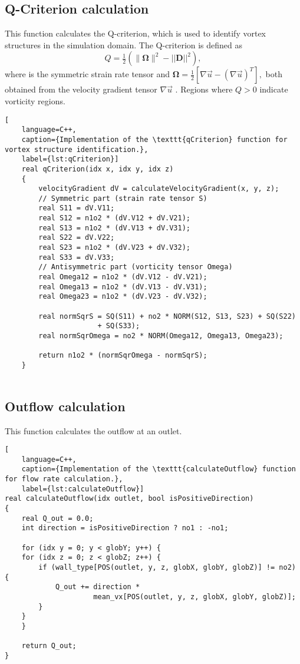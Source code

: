 \subsection*{Q-Criterion calculation}
This function calculates the Q-criterion, which is used to identify vortex structures in the simulation domain. The Q-criterion is defined as
\[
Q = \tfrac{1}{2} \left( \|\boldsymbol{\Omega}\|^{2} - ||\mathbf{D}||^{2} \right),
\]
where is the symmetric strain rate tensor and \(\boldsymbol{\Omega} = \frac{1}{2} \left[ \nabla \vec{u} - (\nabla \vec{u})^T \right],\) both obtained from the velocity gradient tensor \(\nabla \vec{u}\) \cite{Chong1990}. Regions where \(Q > 0\) indicate vorticity regions.
\begin{lstlisting}[
	language=C++,
	caption={Implementation of the \texttt{qCriterion} function for vortex structure identification.},
	label={lst:qCriterion}]
	real qCriterion(idx x, idx y, idx z)
	{
		velocityGradient dV = calculateVelocityGradient(x, y, z);
		// Symmetric part (strain rate tensor S)
		real S11 = dV.V11;
		real S12 = n1o2 * (dV.V12 + dV.V21);
		real S13 = n1o2 * (dV.V13 + dV.V31);
		real S22 = dV.V22;
		real S23 = n1o2 * (dV.V23 + dV.V32);
		real S33 = dV.V33;
		// Antisymmetric part (vorticity tensor Omega)
		real Omega12 = n1o2 * (dV.V12 - dV.V21);
		real Omega13 = n1o2 * (dV.V13 - dV.V31);
		real Omega23 = n1o2 * (dV.V23 - dV.V32);
		
		real normSqrS = SQ(S11) + no2 * NORM(S12, S13, S23) + SQ(S22)
		              + SQ(S33);
		real normSqrOmega = no2 * NORM(Omega12, Omega13, Omega23);
		
		return n1o2 * (normSqrOmega - normSqrS);
	}


\end{lstlisting}


\subsection*{Outflow calculation}
This function calculates the outflow at an outlet.
\begin{lstlisting}[
	language=C++,
	caption={Implementation of the \texttt{calculateOutflow} function for flow rate calculation.},
	label={lst:calculateOutflow}]
real calculateOutflow(idx outlet, bool isPositiveDirection)
{
	real Q_out = 0.0;
	int direction = isPositiveDirection ? no1 : -no1;
	
	for (idx y = 0; y < globY; y++) {
	for (idx z = 0; z < globZ; z++) {
		if (wall_type[POS(outlet, y, z, globX, globY, globZ)] != no2) {
			Q_out += direction * 
					 mean_vx[POS(outlet, y, z, globX, globY, globZ)];
		}
	}
	}
	
	return Q_out;
}
\end{lstlisting}
